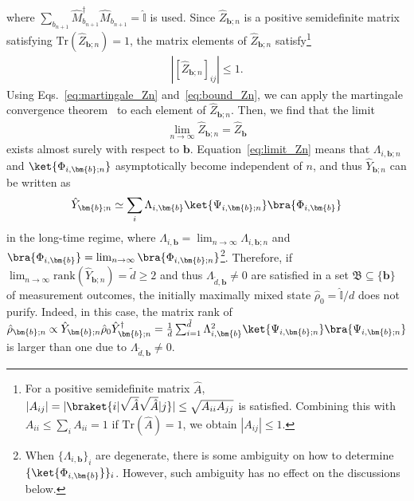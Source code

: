 \documentclass[preprint,pteplogo]{ptephy_v2}%
\numberwithin{equation}{section}
\theoremstyle{definition}
\newcommand{\mr}[1]{\mathrm{#1}}
\newcommand{\mbb}[1]{\mathbb{#1}}
\newcommand{\Tr}{\mr{Tr}}
\begin{document}
where $\sum_{b_{n+1}}\hat{M}_{b_{n+1}}^\dagger\hat{M}_{b_{n+1}}=\hat{\mbb{I}}$ is used. 
Since $\hat{Z}_{\bm{b};n}$ is a positive semidefinite matrix satisfying $\mathrm{Tr}\left(\hat{Z}_{\bm{b};n}\right)=1$, the matrix elements of $\hat{Z}_{\bm{b};n}$ satisfy\footnote{
For a positive semidefinite matrix $\hat{A}$, $|A_{ij}|= |\braket{i|\sqrt{\hat{A}}\sqrt{\hat{A}}|j}|\leq \sqrt{A_{ii}A_{jj}}$ is satisfied. 
Combining this with  $A_{ii}\leq \sum_{i}A_{ii}=1$ if $\Tr(\hat{A})=1$, we obtain $|A_{ij}|\leq 1$.
}
\begin{align}
    \left|\left[\hat{Z}_{\bm{b};n}\right]_{ij}\right|\leq1.
    \label{eq:bound_Zn}
\end{align}
Using Eqs.~\eqref{eq:martingale_Zn} and~\eqref{eq:bound_Zn}, we can apply the martingale convergence theorem~\cite{hall2014martingale} to each element of $\hat{Z}_{\bm{b};n}$. 
Then, we find that the limit
\begin{align}
    \lim_{n\rightarrow\infty}\hat{Z}_{\bm{b};n}=\hat{Z}_{\bm{b}}
    \label{eq:limit_Zn}
\end{align}
exists almost surely with respect to $\bm{b}$. 
Equation~\eqref{eq:limit_Zn} means that $\Lambda_{i,\bm{b};n}$ and $\ket{\Phi_{i,\bm{b};n}}$ asymptotically become independent of $n$, and thus $\hat{Y}_{\bm{b};n}$ can be written as
\begin{align}
    \hat{Y}_{\bm{b};n}\simeq\sum_i\Lambda_{i,\bm{b}}\ket{\Psi_{i,\bm{b};n}}\bra{\Phi_{i,\bm{b}}}
    \label{eq:limit_Y}
\end{align}
in the long-time regime, where $\Lambda_{i,\bm{b}}=\lim_{n\rightarrow\infty}\Lambda_{i,\bm{b};n}$ and $\bra{\Phi_{i,\bm{b}}}=\lim_{n\rightarrow\infty}\bra{\Phi_{i,\bm{b};n}}$\footnote{
When $\{\Lambda_{i,\bm{b}}\}_i$ are degenerate, there is some ambiguity on how to determine $\{\ket{\Phi_{i,\bm{b}}}\}_i$. 
However, such ambiguity has no effect on the discussions below.
}. 
Therefore, if $\lim_{n\rightarrow\infty}\mathrm{rank}\left(\hat{Y}_{\bm{b};n}\right)=\tilde{d}\geq2$ and thus $\Lambda_{\tilde{d},\bm{b}}\neq0$ are satisfied in a set $\mathfrak{B} \subseteq \{ \bm{b} \} $ of measurement outcomes, the initially maximally mixed state $\hat{\rho}_0=\hat{\mathbb{I}}/d$ does not purify. 
Indeed, in this case, the matrix rank of $\hat{\rho}_{\bm{b};n}\propto\hat{Y}_{\bm{b};n}\hat{\rho}_0\hat{Y}_{\bm{b};n}^\dagger=\frac{1}{d}\sum_{i=1}^{\tilde{d}}\Lambda_{i,\bm{b}}^2\ket{\Psi_{i,\bm{b};n}}\bra{\Psi_{i,\bm{b};n}}$ is larger than one due to $\Lambda_{\tilde{d},\bm{b}}\neq0$. 
\end{document}
